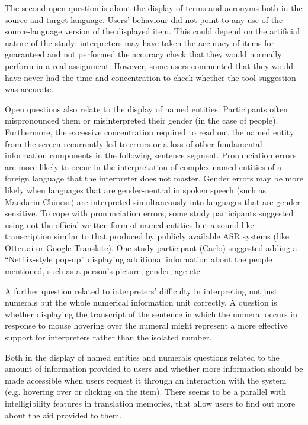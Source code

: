 The second open question is about the display of terms and acronyms both in the source and target language. Users’ behaviour did not point to any use of the source-language version of the displayed item. This could depend on the artificial nature of the study: interpreters may have taken the accuracy of items for guaranteed and not performed the accuracy check that they would normally perform in a real assignment. However, some users commented that they would have never had the time and concentration to check whether the tool suggestion was accurate.

Open questions also relate to the display of named entities. Participants often mispronounced them or misinterpreted their gender (in the case of people). Furthermore, the excessive concentration required to read out the named entity from the screen recurrently led to errors or a loss of other fundamental information components in the following sentence segment. Pronunciation errors are more likely to occur in the interpretation of complex named entities of a foreign language that the interpreter does not master. Gender errors may be more likely when languages that are gender-neutral in spoken speech (such as Mandarin Chinese) are interpreted simultaneously into languages that are gender-sensitive. To cope with pronunciation errors, some study participants suggested using not the official written form of named entities but a sound-like transcription similar to that produced by publicly available ASR systems (like Otter.ai or Google Translate). One study participant (Carlo) suggested adding a ``Netflix-style pop-up'' displaying additional information about the people mentioned, such as a person’s picture, gender, age etc.

A further question related to interpreters’ difficulty in interpreting not just numerals but the whole numerical information unit correctly. A question is whether displaying the transcript of the sentence in which the numeral occurs in response to mouse hovering over the numeral might represent a more effective support for interpreters rather than the isolated number.

Both in the display of named entities and numerals questions related to the amount of information provided to users and whether more information should be made accessible when users request it through an interaction with the system (e.g. hovering over or clicking on the item). There seems to be a parallel with intelligibility features in translation memories, that allow users to find out more about the aid provided to them.





